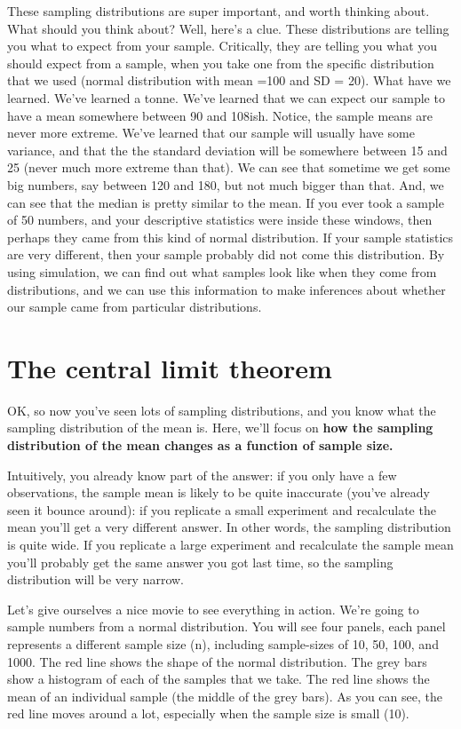 \documentclass[
]{book}
\begin{document}
These sampling distributions are super important, and worth thinking about. What should you think about? Well, here's a clue. These distributions are telling you what to expect from your sample. Critically, they are telling you what you should expect from a sample, when you take one from the specific distribution that we used (normal distribution with mean =100 and SD = 20). What have we learned. We've learned a tonne. We've learned that we can expect our sample to have a mean somewhere between 90 and 108ish. Notice, the sample means are never more extreme. We've learned that our sample will usually have some variance, and that the the standard deviation will be somewhere between 15 and 25 (never much more extreme than that). We can see that sometime we get some big numbers, say between 120 and 180, but not much bigger than that. And, we can see that the median is pretty similar to the mean. If you ever took a sample of 50 numbers, and your descriptive statistics were inside these windows, then perhaps they came from this kind of normal distribution. If your sample statistics are very different, then your sample probably did not come this distribution. By using simulation, we can find out what samples look like when they come from distributions, and we can use this information to make inferences about whether our sample came from particular distributions.

\section{The central limit theorem}\label{the-central-limit-theorem}

OK, so now you've seen lots of sampling distributions, and you know what the sampling distribution of the mean is. Here, we'll focus on \textbf{how the sampling distribution of the mean changes as a function of sample size.}

Intuitively, you already know part of the answer: if you only have a few observations, the sample mean is likely to be quite inaccurate (you've already seen it bounce around): if you replicate a small experiment and recalculate the mean you'll get a very different answer. In other words, the sampling distribution is quite wide. If you replicate a large experiment and recalculate the sample mean you'll probably get the same answer you got last time, so the sampling distribution will be very narrow.

Let's give ourselves a nice movie to see everything in action. We're going to sample numbers from a normal distribution. You will see four panels, each panel represents a different sample size (n), including sample-sizes of 10, 50, 100, and 1000. The red line shows the shape of the normal distribution. The grey bars show a histogram of each of the samples that we take. The red line shows the mean of an individual sample (the middle of the grey bars). As you can see, the red line moves around a lot, especially when the sample size is small (10).
\end{document}
